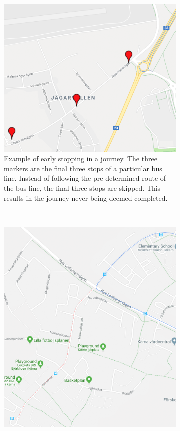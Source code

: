\begin{figure}[h!]
    \centering
    \begin{subfigure}[t]{0.6\textwidth}
        \centering
        \includegraphics[width=\textwidth]{figures/edge_case_early_quit}
        \caption[]
        {\small Example of early stopping in a journey.
        The three markers are the final three stops of a particular bus line.
        Instead of following the pre-determined route of the bus line, the final three stops are skipped.
        This results in the journey never being deemed completed.}
        \label{fig:human-error-early-stopping-1}
    \end{subfigure}
    ~
    \begin{subfigure}[t]{0.6\textwidth}
        \centering
        \includegraphics[width=\textwidth]{figures/lazy_driver_2}

\end{subfigure}
\end{figure}
